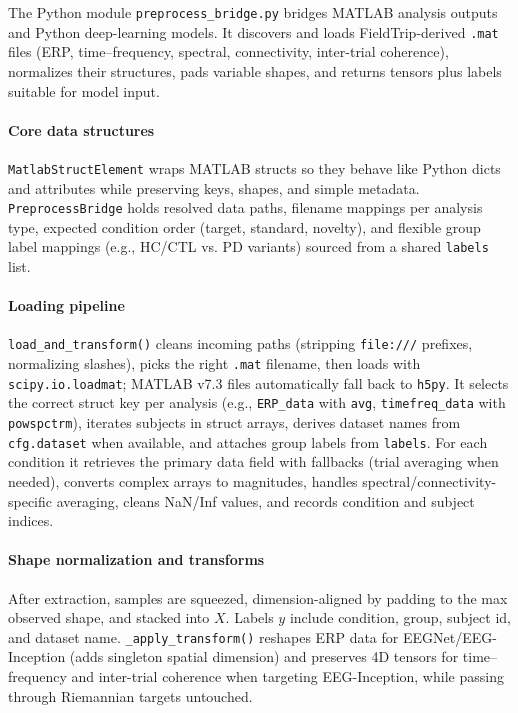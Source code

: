 \documentclass[12pt]{report}
\begin{document}
The Python module \texttt{preprocess\_bridge.py} bridges MATLAB analysis outputs and Python deep-learning models. It discovers and loads FieldTrip-derived \texttt{.mat} files (ERP, time--frequency, spectral, connectivity, inter-trial coherence), normalizes their structures, pads variable shapes, and returns tensors plus labels suitable for model input.

\paragraph{Core data structures}\mbox{}

\texttt{MatlabStructElement} wraps MATLAB structs so they behave like Python dicts and attributes while preserving keys, shapes, and simple metadata. \texttt{PreprocessBridge} holds resolved data paths, filename mappings per analysis type, expected condition order (target, standard, novelty), and flexible group label mappings (e.g., HC/CTL vs. PD variants) sourced from a shared \texttt{labels} list.

\paragraph{Loading pipeline}\mbox{}

\texttt{load\_and\_transform()} cleans incoming paths (stripping \texttt{file:///} prefixes, normalizing slashes), picks the right \texttt{.mat} filename, then loads with \texttt{scipy.io.loadmat}; MATLAB v7.3 files automatically fall back to \texttt{h5py}. It selects the correct struct key per analysis (e.g., \texttt{ERP\_data} with \texttt{avg}, \texttt{timefreq\_data} with \texttt{powspctrm}), iterates subjects in struct arrays, derives dataset names from \texttt{cfg.dataset} when available, and attaches group labels from \texttt{labels}. For each condition it retrieves the primary data field with fallbacks (trial averaging when needed), converts complex arrays to magnitudes, handles spectral/connectivity-specific averaging, cleans NaN/Inf values, and records condition and subject indices.

\paragraph{Shape normalization and transforms}\mbox{}

After extraction, samples are squeezed, dimension-aligned by padding to the max observed shape, and stacked into \(X\). Labels \(y\) include condition, group, subject id, and dataset name. \texttt{\_apply\_transform()} reshapes ERP data for EEGNet/EEG-Inception (adds singleton spatial dimension) and preserves 4D tensors for time--frequency and inter-trial coherence when targeting EEG-Inception, while passing through Riemannian targets untouched.
\end{document}
